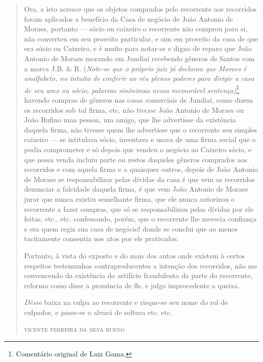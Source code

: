 \begin{quote}
Ora, a isto acresce que os objetos comprados pelo recorrente aos
recorridos foram aplicados a benefício da Casa de negócio de João
Antonio de Moraes, portanto --- sócio ou caixeiro o recorrente não
comprou para si, não converteu em seu proveito particular, e sim em
proveito da casa de que era sócio ou Caixeiro, e é muito para notar-se e
digno de reparo que João Antonio de Moraes morando em Jundiaí recebendo
gêneros de Santos com a marca J.B. \& R. (\emph{Note-se que o próprio
juiz já declarou que Moraes é analfabeto, no intuito de conferir ao réu
plenos poderes para dirigir a casa de seu amo ou sócio, palavras
sinônimas nessa memorável sentença)}\footnote{ Comentário original de
  Luiz Gama.} havendo compras de gêneros nas casas comerciais de
Jundiaí, como dizem os recorridos sob tal firma, etc. não \emph{tivesse}
João Antonio de Moraes ou João Rufino uma pessoa, um amigo, que lhe
advertisse da existência daquela firma, não tivesse quem lhe advertisse
que o recorrente seu simples caixeiro --- se intitulava sócio, inventava e
usava de uma firma social que o podia comprometer e só depois que vendeu
o negócio ao Caixeiro sócio, e que nessa venda incluiu parte ou restos
daqueles gêneros comprados aos recorridos e com aquela firma e a
quaisquer outros, depois de João Antonio de Moraes se responsabilizar
pelas dívidas da casa é que vem os recorridos denunciar a falcidade
daquela firma, é que vem João Antonio de Moraes jurar que nunca existiu
semelhante firma, que ele nunca autorizou o recorrente a fazer compras,
que só se responsabilizou pelas dívidas por ele feitas, etc., etc.
confessando, porém, que o recorrente lhe merecia confiança e era quem
regia sua casa de negócio! donde se conclui que ao menos tacitamente
consentia nos atos por ele praticados.

Portanto, à vista do exposto e do mais dos autos onde existem à certos
respeitos testemunhas contraproducentes a intenção dos recorridos, não
me convencendo da existência do artifício fraudulento da parte do
recorrente, reformo como disse a pronúncia de fls. e julgo improcedente
a queixa.

\emph{Dêsse} baixa na culpa ao recorrente e risque-se seu nome do rol de
culpados, e passe-se o alvará de soltura etc. etc.

\begin{flushright}
\textsc{vicente ferreira da silva bueno}
\end{flushright}
\end{quote}

\asterisc{}

